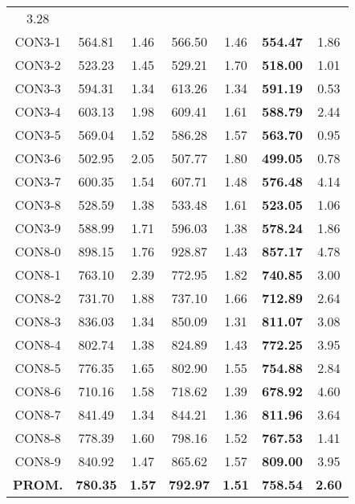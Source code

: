 \begin{table}[h]
\begin{tabular}{c c c c c c c}
3.28\\CON3-1 & 564.81 & 1.46 & 
566.50 & 1.46 & \bf{554.47} & 
1.86\\CON3-2 & 523.23 & 1.45 & 
529.21 & 1.70 & \bf{518.00} & 
1.01\\CON3-3 & 594.31 & 1.34 & 
613.26 & 1.34 & \bf{591.19} & 
0.53\\CON3-4 & 603.13 & 1.98 & 
609.41 & 1.61 & \bf{588.79} & 
2.44\\CON3-5 & 569.04 & 1.52 & 
586.28 & 1.57 & \bf{563.70} & 
0.95\\CON3-6 & 502.95 & 2.05 & 
507.77 & 1.80 & \bf{499.05} & 
0.78\\CON3-7 & 600.35 & 1.54 & 
607.71 & 1.48 & \bf{576.48} & 
4.14\\CON3-8 & 528.59 & 1.38 & 
533.48 & 1.61 & \bf{523.05} & 
1.06\\CON3-9 & 588.99 & 1.71 & 
596.03 & 1.38 & \bf{578.24} & 
1.86\\CON8-0 & 898.15 & 1.76 & 
928.87 & 1.43 & \bf{857.17} & 
4.78\\CON8-1 & 763.10 & 2.39 & 
772.95 & 1.82 & \bf{740.85} & 
3.00\\CON8-2 & 731.70 & 1.88 & 
737.10 & 1.66 & \bf{712.89} & 
2.64\\CON8-3 & 836.03 & 1.34 & 
850.09 & 1.31 & \bf{811.07} & 
3.08\\CON8-4 & 802.74 & 1.38 & 
824.89 & 1.43 & \bf{772.25} & 
3.95\\CON8-5 & 776.35 & 1.65 & 
802.90 & 1.55 & \bf{754.88} & 
2.84\\CON8-6 & 710.16 & 1.58 & 
718.62 & 1.39 & \bf{678.92} & 
4.60\\CON8-7 & 841.49 & 1.34 & 
844.21 & 1.36 & \bf{811.96} & 
3.64\\CON8-8 & 778.39 & 1.60 & 
798.16 & 1.52 & \bf{767.53} & 
1.41\\CON8-9 & 840.92 & 1.47 & 
865.62 & 1.57 & \bf{809.00} & 
3.95\\\bf{PROM.} & 
\bf{780.35} & \bf{1.57} & \bf{792.97} & \bf{1.51} & \bf{758.54} & \bf{2.60}\\[1ex]\hline
\end{tabular}
\label{table:ILS-VND-M-25-10}
\end{table}

